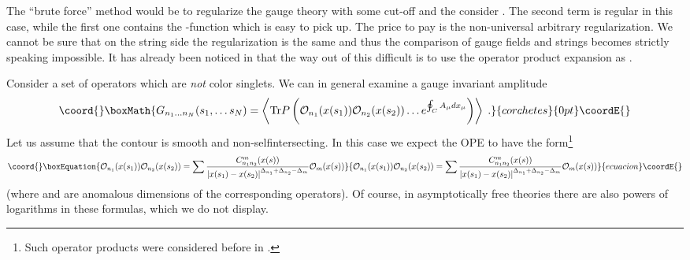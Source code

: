\documentclass[a4paper,12pt]{article}
\numberwithin{equation}{section}
\begin{document}
The ``brute force'' method would be to regularize the gauge theory with some
cut-off \myHighlight{\( \Lambda  \)}\coordHE{} and the consider \coordHE{}. The second
term is regular in this case, while the first one contains the \myHighlight{\( \delta  \)}\coordHE{}-function
which is easy to pick up. The price to pay is the non-universal arbitrary regularization.
We cannot be sure that on the string side the regularization is the same and
thus the comparison of gauge fields and strings becomes strictly speaking impossible.
It has already been noticed in \cite{6} that the way out of this difficult
is to use the operator product expansion as \coordHE{}. 

Consider a set of operators \coordHE{} which
are \emph{not} color singlets. We can in general examine a gauge invariant amplitude
\[\coord{}\boxMath{
G_{n_{1}\ldots n_{N}}(s_{1},\ldots s_{N})=\left\langle \textrm{Tr}P\left( \mathcal{O}_{n_{1}}(x(s_{1}))\mathcal{O}_{n_{2}}(x(s_{2}))\ldots e^{\oint _{C}A_{\mu }dx_{\mu }}\right) \right\rangle \; .}{corchetes}{0pt}\coordE{}\]
 Let us assume that the contour \coordHE{} is smooth and non-selfintersecting.
In this case we expect the OPE to have the form\footnote{%
Such operator products were considered before in \cite{16}.
}
\begin{equation}\coord{}\boxEquation{
\label{2.4}
\mathcal{O}_{n_{1}}(x(s_{1}))\mathcal{O}_{n_{2}}(x(s_{2}))=\sum \frac{C^{m}_{n_{1}n_{2}}(x(s))}{\left| x(s_{1})-x(s_{2})\right| ^{\Delta _{n_{1}}+\Delta _{n_{2}}-\Delta _{m}}}\mathcal{O}_{m}(x(s))
}{
\mathcal{O}_{n_{1}}(x(s_{1}))\mathcal{O}_{n_{2}}(x(s_{2}))=\sum \frac{C^{m}_{n_{1}n_{2}}(x(s))}{\left| x(s_{1})-x(s_{2})\right| ^{\Delta _{n_{1}}+\Delta _{n_{2}}-\Delta _{m}}}\mathcal{O}_{m}(x(s))
}{ecuacion}\coordE{}\end{equation}
 (where \coordHE{} and \coordHE{} are anomalous
dimensions of the corresponding operators). Of course, in asymptotically free
theories there are also powers of logarithms \coordHE{}
in these formulas, which we do not display.
\end{document}
